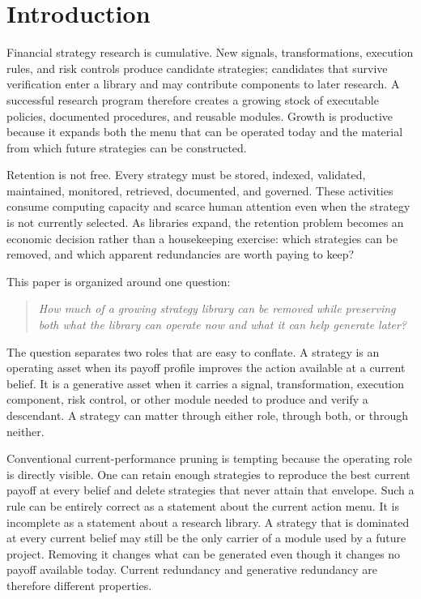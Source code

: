 \section{Introduction}\label{sec:introduction}

Financial strategy research is cumulative. New signals, transformations,
execution rules, and risk controls produce candidate strategies; candidates
that survive verification enter a library and may contribute components to
later research. A successful research program therefore creates a growing
stock of executable policies, documented procedures, and reusable modules.
Growth is productive because it expands both the menu that can be operated
today and the material from which future strategies can be constructed.

Retention is not free. Every strategy must be stored, indexed, validated,
maintained, monitored, retrieved, documented, and governed. These activities
consume computing capacity and scarce human attention even when the strategy
is not currently selected. As libraries expand, the retention problem becomes
an economic decision rather than a housekeeping exercise: which strategies
can be removed, and which apparent redundancies are worth paying to keep?

This paper is organized around one question:
\begin{quote}
\emph{How much of a growing strategy library can be removed while preserving
both what the library can operate now and what it can help generate later?}
\end{quote}
The question separates two roles that are easy to conflate. A strategy is an
operating asset when its payoff profile improves the action available at a
current belief. It is a generative asset when it carries a signal,
transformation, execution component, risk control, or other module needed to
produce and verify a descendant. A strategy can matter through either role,
through both, or through neither.

Conventional current-performance pruning is tempting because the operating
role is directly visible. One can retain enough strategies to reproduce the
best current payoff at every belief and delete strategies that never attain
that envelope. Such a rule can be entirely correct as a statement about the
current action menu. It is incomplete as a statement about a research
library. A strategy that is dominated at every current belief may still be the
only carrier of a module used by a future project. Removing it changes what
can be generated even though it changes no payoff available today. Current
redundancy and generative redundancy are therefore different properties.

